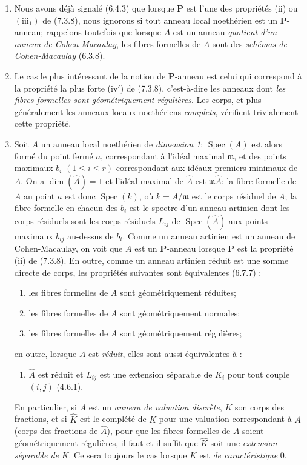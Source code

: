\begin{remarks}[7.3.19]
\begin{enumerate}
\item[\textup{(ii)}] Nous avons déjà signalé (6.4.3) que lorsque $\boldsymbol P$ est
l'une des propriétés (ii) ou $(\mathrm{iii}_1)$ de (7.3.8), nous ignorons
si tout anneau local noethérien est un $\boldsymbol P$-anneau; rappelons
toutefois que lorsque $A$ est un anneau \emph{quotient d'un anneau de
Cohen-Macaulay}, les fibres formelles de $A$ sont des \emph{schémas de
Cohen-Macaulay} (6.3.8).
\item[\textup{(iii)}] Le cas le plus intéressant de la notion de $\boldsymbol P$-anneau
est celui qui correspond à la propriété la plus forte (iv$'$) de
(7.3.8), c'est-à-dire les anneaux dont \emph{les fibres formelles sont
géométriquement régulières}. Les corps, et plus généralement les anneaux
locaux noethériens \emph{complets}, vérifient trivialement cette
propriété.
\item[\textup{(iv)}] Soit $A$ un anneau local noethérien de \emph{dimension 1};
$\operatorname{Spec}(A)$ est alors formé du point fermé $a$,
correspondant à l'idéal maximal $\mathfrak m$, et des points maximaux
$b_i$ $(1\leqslant i\leqslant r)$ correspondant aux idéaux premiers
minimaux de $A$. On a $\dim(\widehat A)=1$ et l'idéal maximal de
$\widehat A$ est $\mathfrak m\widehat A$; la fibre formelle de $A$ au
point $a$ est donc $\operatorname{Spec}(k)$, où $k=A/\mathfrak m$ est le
corps résiduel de $A$; la fibre formelle en chacun des $b_i$ est le
spectre d'un anneau artinien dont les corps résiduels sont les corps
résiduels $L_{ij}$ de $\operatorname{Spec}(\widehat A)$ aux points
maximaux $b_{ij}$ au-dessus de $b_i$. Comme un anneau artinien est un
anneau de Cohen-Macaulay, on voit que $A$ est un
$\boldsymbol P$-anneau lorsque $\boldsymbol P$ est la propriété (ii) de
(7.3.8). En outre, comme un anneau artinien réduit est une somme directe
de corps, les propriétés suivantes sont équivalentes (6.7.7) :
\begin{enumerate}
\item[\emph{a)}] les fibres formelles de $A$ sont géométriquement réduites;
\item[\emph{b)}] les fibres formelles de $A$ sont géométriquement normales;
\item[\emph{c)}] les fibres formelles de $A$ sont géométriquement régulières;
\end{enumerate}
en outre, lorsque $A$ est \emph{réduit}, elles sont aussi équivalentes à :
\begin{enumerate}
\item[\emph{d)}] $\widehat A$ est réduit et $L_{ij}$ est une extension séparable de
$K_i$ pour tout couple $(i,j)$ (4.6.1).
\end{enumerate}

En particulier, si $A$ est un \emph{anneau de valuation discrète}, $K$
son corps des fractions, et si $\widehat K$ est le complété de $K$ pour
une valuation correspondant à $A$ (corps des fractions de $\widehat A$),
pour que les fibres formelles de $A$ soient géométriquement régulières,
il faut et il suffit que $\widehat K$ soit une \emph{extension séparable
de} $K$. Ce sera toujours le cas lorsque $K$ est \emph{de caractéristique}
0.
\end{enumerate}
\end{remarks}

